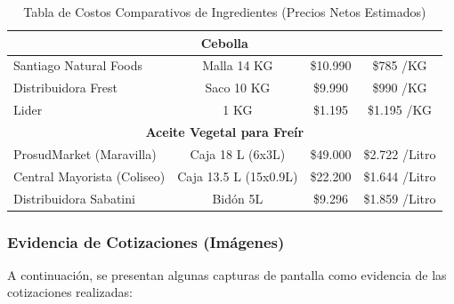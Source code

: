 \documentclass[12pt]{article}
\begin{document}
\begin{table}[h!]
\begin{tabular}{|| l | c | c | c||}
        \multicolumn{4}{||c||}{\textbf{Cebolla}} \\ [0.5ex] \hline \hline
        Santiago Natural Foods & Malla 14 KG & \$10.990 & \$785 /KG \\ \hline
        Distribuidora Frest & Saco 10 KG & \$9.990 & \$990 /KG \\ \hline
        Lider & 1 KG & \$1.195 & \$1.195 /KG \\ [1ex] \hline \hline

        \multicolumn{4}{||c||}{\textbf{Aceite Vegetal para Freír}} \\ [0.5ex] \hline \hline
        ProsudMarket (Maravilla) & Caja 18 L (6x3L) & \$49.000 & \$2.722 /Litro \\ \hline %
        Central Mayorista (Coliseo) & Caja 13.5 L (15x0.9L) & \$22.200 & \$1.644 /Litro \\ \hline
        Distribuidora Sabatini & Bidón 5L & \$9.296 & \$1.859 /Litro \\ [1ex] \hline \hline
    \end{tabular}
    \caption{Tabla de Costos Comparativos de Ingredientes (Precios Netos Estimados)}
    \label{tab:costos_ingredientes_comparativos}
\end{table}
\newpage

\subsubsection{Evidencia de Cotizaciones (Imágenes)}
A continuación, se presentan algunas capturas de pantalla como evidencia de las cotizaciones realizadas:
\end{document}
